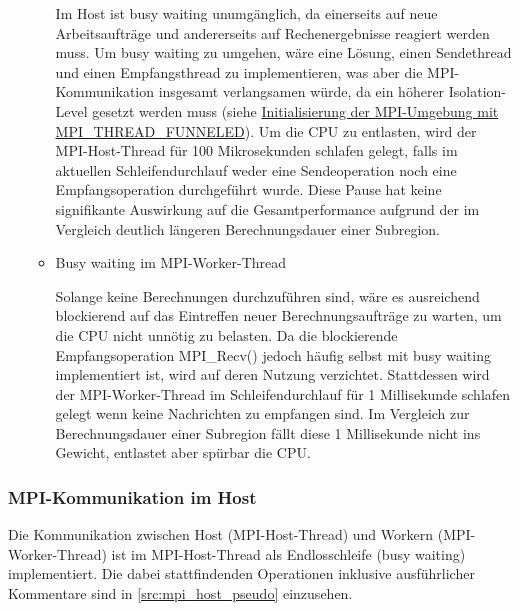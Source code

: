 \begin{itemize}
\begin{itemize}
		            Im Host ist busy waiting unumgänglich, da einerseits auf neue Arbeitsaufträge und andererseits auf Rechenergebnisse reagiert werden muss. Um busy waiting zu umgehen, wäre eine Lösung, einen Sendethread und einen Empfangsthread zu implementieren, was aber die MPI-Kommunikation insgesamt verlangsamen würde, da ein höherer Isolation-Level gesetzt werden muss (siehe \hyperref[item:mpi_init]{Initialisierung der MPI-Umgebung mit MPI\_THREAD\_FUNNELED}). Um die CPU zu entlasten, wird der MPI-Host-Thread für 100 Mikrosekunden schlafen gelegt, falls im aktuellen Schleifendurchlauf weder eine Sendeoperation noch eine Empfangsoperation durchgeführt wurde. Diese Pause hat keine signifikante Auswirkung auf die Gesamtperformance aufgrund der im Vergleich deutlich längeren Berechnungsdauer einer Subregion.

		      \item Busy waiting im MPI-Worker-Thread

                    Solange keine Berechnungen durchzuführen sind, wäre es ausreichend blockierend auf das Eintreffen neuer Berechnungsaufträge zu warten, um die CPU nicht unnötig zu belasten.
                    Da die blockierende Empfangsoperation MPI\_Recv() jedoch häufig selbst mit busy waiting implementiert ist, wird auf deren Nutzung verzichtet. Stattdessen wird der MPI-Worker-Thread im Schleifendurchlauf für 1 Millisekunde schlafen gelegt wenn keine Nachrichten zu empfangen sind. Im Vergleich zur Berechnungsdauer einer Subregion fällt diese 1 Millisekunde nicht ins Gewicht, entlastet aber spürbar die CPU.

	      \end{itemize}

\end{itemize}

\subsubsection{MPI-Kommunikation im Host}

Die Kommunikation zwischen Host (MPI-Host-Thread) und Workern (MPI-Worker-Thread) ist im MPI-Host-Thread als Endlosschleife (busy waiting) implementiert. Die dabei stattfindenden Operationen inklusive ausführlicher Kommentare sind in \autoref{src:mpi_host_pseudo} einzusehen.

